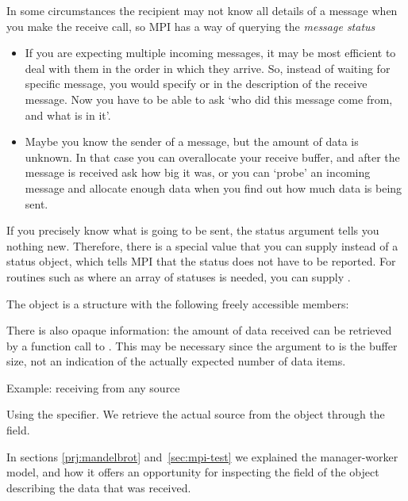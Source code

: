 In some circumstances the recipient may not know all details of a
message when you make the receive call, so MPI has a way of querying
the \emph{message status}
\begin{itemize}
\item If you are expecting multiple incoming messages, it may be most
  efficient to deal with them in the order in which they arrive. So,
  instead of waiting for specific message, you would specify
   or  in
  the description of the receive message. 
  Now you have to be able to ask `who did this message come from,
  and what is in it'.
\item Maybe you know the sender of a message, but the amount of data
  is unknown. In that case you can overallocate your receive buffer,
  and after the message is received ask how big it was, or you can
  `probe' an incoming message and allocate enough data when you find
  out how much data is being sent.
\end{itemize}


If you 
precisely know what is going to be sent, the status argument tells you 
nothing new. Therefore, there is a special value 
that you can supply instead of a status object, which tells MPI that the 
status does not have to be reported. For routines such as 
where an array of statuses is needed, you can supply .

The  object
is a structure with the following
freely accessible members:
%
%
%

There is also
opaque information: the amount of data received can be retrieved by a
function call to .
%
%
This may be necessary since the  argument to  is 
the buffer size, not an indication of the actually expected number of
data items.

 {Example: receiving from any source}

Using the  specifier. We retrieve the
actual source from the  object through the
 field.
%
%

In sections \ref{prj:mandelbrot} and~\ref{sec:mpi-test} we explained
the manager-worker model, and how it offers an opportunity for inspecting the
 field of the 
object describing the data that was received.

